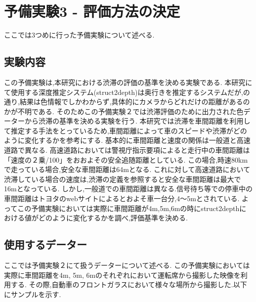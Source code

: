 \newpage
\section{予備実験3 - 評価方法の決定}
\label{sec:yobi03}
ここでは3つめに行った予備実験について述べる.
\subsection{実験内容}
この予備実験は,本研究における渋滞の評価の基準を決める実験である.
本研究にて使用する深度推定システム(struct2depth)\cite{casser2019struct2depth}は奥行きを推定するシステムだが,の通り,結果は色情報でしかわからず,具体的にカメラからどれだけの距離があるのかが不明である.
そのためこの予備実験２では渋滞評価のために出力された色データーから渋滞の基準を決める実験を行う.
本研究では渋滞を車間距離を利用して推定する手法をとっているため,車間距離によって車のスピードや渋滞がどのように変化するかを参考にする.
基本的に車間距離と速度の関係は一般道と高速道路で異なる.
高速道路においては警視庁指示要項によると走行中の車間距離は「速度の２乗/100」をおおよその安全追随距離としている\cite{highway}.
この場合,時速80kmで走っている場合,安全な車間距離は64mとなる.
これに対して高速道路において渋滞している場合の速度は,渋滞の定義を参照すると安全な車間距離は最大で16mとなっている.
しかし,一般道での車間距離は異なる.信号待ち等での停車中の車間距離はトヨタのwebサイトによるとおよそ車一台分,4〜5mとされている\cite{toyota_web}.
よってこの予備実験においては実際に車間距離が4m,5m,6mの時にstruct2depthにおける値がどのように変化するかを調べ,評価基準を決める.


\subsection{使用するデーター}
ここでは予備実験２にて扱うデーターについて述べる.
この予備実験においては実際に車間距離を4m, 5m, 6mのそれぞれにおいて運転席から撮影した映像を利用する.
その際,自動車のフロントガラスにおいて様々な場所から撮影した.以下にサンプルを示す.


